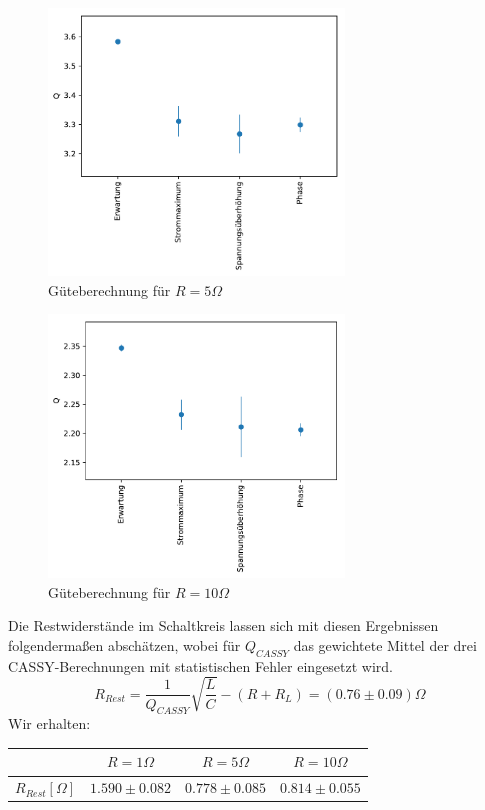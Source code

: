 \documentclass[12pt,a4paper]{article}
\begin{document}
\begin{figure}[H]
	\centering
	\includegraphics[width=0.7\textwidth]{Python/S5_Fazit.pdf}
	\caption{Güteberechnung für $R=5\Omega$}
	\label{S5_Fazit}
\end{figure}
\begin{figure}[H]
	\centering
	\includegraphics[width=0.7\textwidth]{Python/S10_Fazit.pdf}
	\caption{Güteberechnung für $R=10\Omega$}
	\label{S10_Fazit}
\end{figure}

Die Restwiderstände im Schaltkreis lassen sich mit diesen Ergebnissen folgendermaßen abschätzen, wobei für $Q_{CASSY}$ das gewichtete Mittel der drei CASSY-Berechnungen mit statistischen Fehler eingesetzt wird.
\begin{equation}
R_{Rest}=\frac{1}{Q_{CASSY}}\sqrt{\frac{L}{C}}-(R+R_L)=(0.76\pm0.09)\Omega
\end{equation}
Wir erhalten:
\begin{table}[H]
	\centering
	\begin{tabular}{|l|c|c|c|}
		\hline
		&$R=1\Omega$&$R=5\Omega$&$R=10\Omega$\\
		\hline
		$R_{Rest}[\Omega]$&$1.590\pm 0.082$&$0.778\pm 0.085$&$0.814\pm 0.055$\\
		\hline
	\end{tabular}
\end{table}
\end{document}
